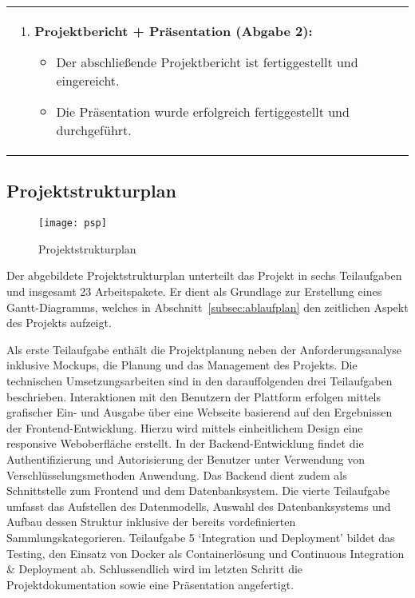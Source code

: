 \begin{tabularx}{\textwidth}{L R}
\begin{enumerate}[left=0pt,label=\arabic*.,itemsep=0.4cm]
            \item \textbf{Projektbericht + Präsentation (Abgabe 2):}
            \begin{itemize}[leftmargin=*]
                \item Der abschließende Projektbericht ist fertiggestellt und eingereicht.
                \item Die Präsentation wurde erfolgreich fertiggestellt und durchgeführt.
            \end{itemize}
        \end{enumerate}
    \end{tabularx}

\newpage

\subsection{Projektstrukturplan}\label{subsec:projektstrukturplan}

\begin{figure}[H]
    \centering
    \texttt{[image: psp]}
    \caption{Projektstrukturplan}\label{fig:projektstrukturplan}
\end{figure}

Der abgebildete Projektstrukturplan unterteilt das Projekt in sechs Teilaufgaben und insgesamt 23 Arbeitspakete.
Er dient als Grundlage zur Erstellung eines Gantt-Diagramms, welches in Abschnitt~\ref{subsec:ablaufplan} den zeitlichen Aspekt des Projekts aufzeigt.

Als erste Teilaufgabe enthält die Projektplanung neben der Anforderungsanalyse inklusive Mockups, die Planung und das Management des Projekts.
Die technischen Umsetzungsarbeiten sind in den darauffolgenden drei Teilaufgaben beschrieben.
Interaktionen mit den Benutzern der Plattform erfolgen mittels grafischer Ein- und Ausgabe über eine Webseite basierend auf den Ergebnissen der Frontend-Entwicklung.
Hierzu wird mittels einheitlichem Design eine responsive Weboberfläche erstellt.
In der Backend-Entwicklung findet die Authentifizierung und Autorisierung der Benutzer unter Verwendung von Verschlüsselungsmethoden Anwendung.
Das Backend dient zudem als Schnittstelle zum Frontend und dem Datenbanksystem.
Die vierte Teilaufgabe umfasst das Aufstellen des Datenmodells, Auswahl des Datenbanksystems und Aufbau dessen Struktur inklusive der bereits vordefinierten Sammlungskategorieren.
Teilaufgabe 5 `Integration und Deployment' bildet das Testing, den Einsatz von Docker als Containerlösung und Continuous Integration \& Deployment ab.
Schlussendlich wird im letzten Schritt die Projektdokumentation sowie eine Präsentation angefertigt.


